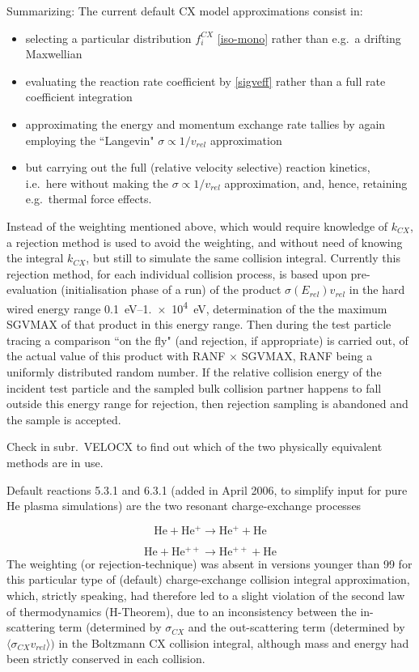 Summarizing: The current default CX model approximations consist in:
\begin{itemize}
  \item[a)] selecting a particular distribution $f_i^{CX}$   \cref{iso-mono}
        rather than e.g.\ a drifting Maxwellian
  \item[b)] evaluating the reaction rate
        coefficient by \cref{sigveff} rather than a full rate coefficient integration
  \item[c)] approximating the energy and momentum exchange rate tallies by again
        employing the ``Langevin" $\sigma \propto 1/v_{rel}$ approximation
  \item[d)]
        but carrying out the full (relative velocity selective) reaction kinetics,
        i.e.\ here without making the $\sigma \propto 1/v_{rel}$ approximation, and,
        hence, retaining e.g.\ thermal force effects.
\end{itemize}
Instead of the weighting mentioned above, which would require knowledge of
$k_{CX}$, a rejection method is used to avoid the weighting, and without need
of knowing the integral $k_{CX}$, but still to simulate the same collision
integral.
Currently this rejection method, for each individual collision process, is
based upon pre-evaluation (initialisation phase of a run) of the product
$\sigma(E_{rel}) v_{rel}$ in the hard wired energy range
\SIrange{0.1}{1.e4}{\electronvolt}, determination of the the maximum SGVMAX of
that product in this energy range.
Then during the test particle tracing a comparison ``on the fly" (and
rejection, if appropriate) is carried out, of the actual value of this product
with {RANF} $\times$ SGVMAX, {RANF} being a uniformly distributed random
number.
If the relative collision energy of the incident test particle and the sampled
bulk collision partner happens to fall outside this energy range for rejection,
then rejection sampling is abandoned and the sample is accepted.

Check in subr.\ VELOCX to find out which of the two physically equivalent
methods are in use.

Default reactions 5.3.1 and 6.3.1 (added in April 2006, to simplify input for
pure He plasma simulations) are the two resonant charge-exchange processes

\begin{displaymath}
  \mathrm{He + He^{+} \rightarrow He^{+}  + He}
\end{displaymath}

\begin{displaymath}
  \mathrm{He + He^{++} \rightarrow He^{++}  + He}
\end{displaymath}
The weighting (or rejection-technique) was absent in versions
younger than 99 for this particular type of (default) charge-exchange collision
integral approximation, which, strictly speaking, had therefore led to a slight
violation of the second law of thermodynamics (H-Theorem), due to an
inconsistency between the in-scattering term (determined by $\sigma_{CX}$ and
the out-scattering term (determined by $\langle\sigma_{CX} v_{rel}\rangle)$ in
the Boltzmann CX collision integral, although mass and energy had been strictly
conserved in each collision.

